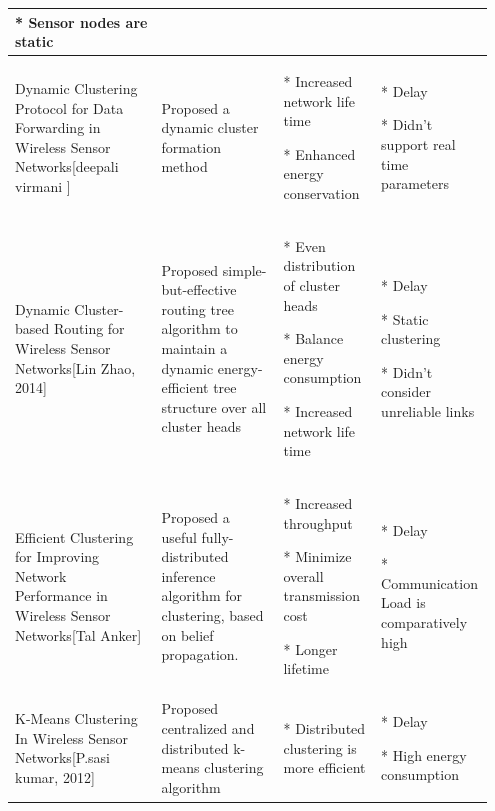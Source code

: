 \documentclass[MTech]{iitmdiss}
\begin{document}
\begin{table}[h]
{\begin{tabular}{|p{0.3\linewidth}|p{0.25\linewidth}|p{0.20\linewidth}|p{0.20\linewidth}|}
* Sensor nodes are static
\\
\hline
\vspace{5mm}
Dynamic Clustering Protocol for Data Forwarding in 
Wireless Sensor Networks[deepali virmani ]	
&\vspace{5mm} Proposed a dynamic cluster formation method&\vspace{0.7mm}
* Increased network life time 

* Enhanced energy conservation

&\vspace{0.7mm}
* Delay 

* Didn't support real time parameters
\\
\hline
\vspace{5mm}
Dynamic Cluster-based Routing for Wireless
Sensor Networks[Lin Zhao, 2014]		

&\vspace{5mm}Proposed simple-but-effective routing tree
algorithm to maintain a dynamic energy-efficient tree structure over all cluster heads&\vspace{0.7mm}
* Even distribution of cluster heads
 
* Balance energy consumption 

* Increased network life time
&
* Delay 

* Static clustering 

* Didn't consider unreliable links
\\
\hline
\vspace{5mm}
Efficient Clustering for Improving Network
Performance in Wireless Sensor Networks[Tal Anker]	 
&\vspace{5mm}Proposed a useful fully-distributed
inference algorithm for clustering, based on belief propagation.&
\vspace{0.7mm}
* Increased throughput
 
* Minimize overall transmission cost

* Longer lifetime	

&\vspace{0.7mm}
* Delay 

* Communication Load is comparatively high
\\
\hline
\vspace{5mm}
K-Means Clustering In Wireless Sensor Networks[P.sasi kumar, 2012]
	 &\vspace{5mm}Proposed centralized and 
distributed k-means clustering algorithm&
\vspace{0.7mm}
* Distributed clustering is  more efficient	
 
&\vspace{0.7mm}
* Delay 

* High energy consumption
\\
\hline
\end{tabular}}
\hfill{}
\end{table}
\end{document}
